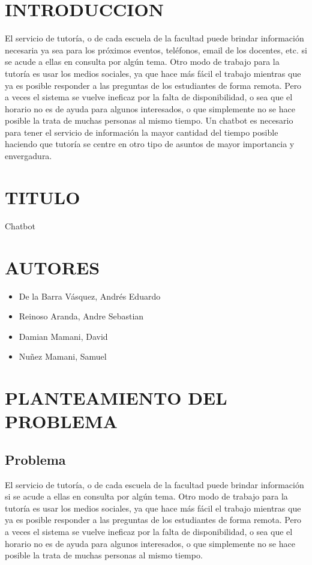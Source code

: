 \documentclass[12pt,letterpaper]{article}
\begin{document}
\section{INTRODUCCION}
El servicio de tutoría, o de cada escuela de la facultad puede brindar información necesaria ya sea para los próximos eventos, teléfonos, email de los docentes, etc. si se acude a ellas en consulta por algún tema. 
Otro modo de trabajo para la tutoría es usar los medios sociales, ya que hace más fácil el trabajo mientras que ya es posible responder a las preguntas de los estudiantes de forma remota. 
Pero a veces el sistema se vuelve ineficaz por la falta de disponibilidad, o sea que el horario no es de ayuda para algunos interesados, o que simplemente no se hace posible la trata de muchas personas al mismo tiempo.
Un chatbot es necesario para tener el servicio de información la mayor cantidad del tiempo posible haciendo que tutoría se centre en otro tipo de asuntos de mayor importancia y envergadura. 




\newpage
\section{TITULO}
	\par Chatbot
\section{AUTORES}

\begin{itemize}
	\item De la Barra Vásquez, Andrés Eduardo
	\item Reinoso Aranda, Andre Sebastian
	\item Damian Mamani, David
	\item Nuñez Mamani, Samuel
	
\end{itemize}



\section{PLANTEAMIENTO DEL PROBLEMA}
	\subsection{Problema}
El servicio de tutoría, o de cada escuela de la facultad puede brindar información si se acude a ellas en consulta por algún tema. Otro modo de trabajo para la tutoría es usar los medios sociales, ya que hace más fácil el trabajo mientras que ya es posible responder a las preguntas de los estudiantes de forma remota. Pero a veces el sistema se vuelve ineficaz por la falta de disponibilidad, o sea que el horario no es de ayuda para algunos interesados, o que simplemente no se hace posible la trata de muchas personas al mismo tiempo.\\
\end{document}
